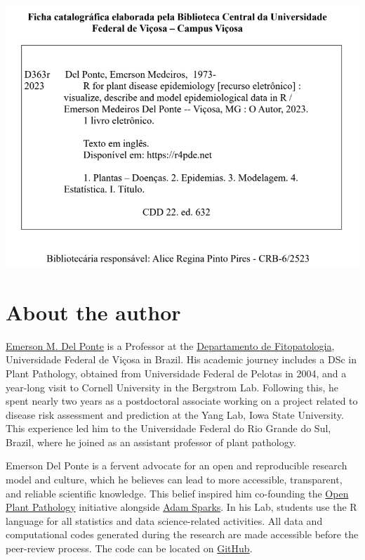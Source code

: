 \documentclass[
  letterpaper,
]{book}
\begin{document}
\includegraphics[width=5.78125in,height=\textheight]{imgs/ficha_cip.png}


\hypertarget{about-the-author}{%
\chapter*{About the author}\label{about-the-author}}


\href{https://emersondelponte.netlify.app/}{Emerson M. Del Ponte} is a
Professor at the
\href{http://www.dfp.ufv.br/graduate/faculty/}{Departamento de
Fitopatologia}, Universidade Federal de Viçosa in Brazil. His academic
journey includes a DSc in Plant Pathology, obtained from Universidade
Federal de Pelotas in 2004, and a year-long visit to Cornell University
in the Bergstrom Lab. Following this, he spent nearly two years as a
postdoctoral associate working on a project related to disease risk
assessment and prediction at the Yang Lab, Iowa State University. This
experience led him to the Universidade Federal do Rio Grande do Sul,
Brazil, where he joined as an assistant professor of plant pathology.

Emerson Del Ponte is a fervent advocate for an open and reproducible
research model and culture, which he believes can lead to more
accessible, transparent, and reliable scientific knowledge. This belief
inspired him co-founding the
\href{http://www.openplantpathology.org/}{Open Plant Pathology}
initiative alongside \href{http://adamhsparks.netlify.app/}{Adam
Sparks}. In his Lab, students use the R language for all statistics and
data science-related activities. All data and computational codes
generated during the research are made accessible before the peer-review
process. The code can be located on
\href{https://github.com/emdelponte}{GitHub}.
\end{document}
